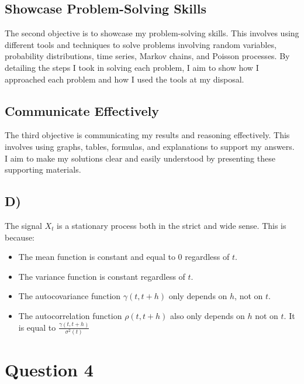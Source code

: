 \documentclass[11pt, letterpaper]{article}
\begin{document}
\subsection{Showcase Problem-Solving Skills}
The second objective is to showcase my problem-solving skills. This involves
using different tools and techniques to solve problems involving random
variables, probability distributions, time series, Markov chains, and Poisson
processes. By detailing the steps I took in solving each problem, I aim to show
how I approached each problem and how I used the tools at my disposal.

\subsection{Communicate Effectively}
The third objective is communicating my results and reasoning effectively. This
involves using graphs, tables, formulas, and explanations to support my
answers. I aim to make my solutions clear and easily understood by presenting
these supporting materials.

\newpage




\newpage
\subsection*{D)}
The signal $X_t$ is a stationary process both in the strict and wide sense.
This is because:

\begin{itemize}
	\item The mean function is constant and equal to $0$ regardless of $t$.

	\item The variance function is constant regardless of $t$.
	\item The autocovariance function $\gamma (t, t+h)$ only depends on
	      $h$, not on
	      $t$.
	\item The autocorrelation function $\rho (t, t+h)$ also only depends on
	      $h$ not on
	      $t$. It is equal to $\frac{\gamma (t, t+h)}{\sigma^2(t)}$
\end{itemize}





\newpage
\section*{Question 4}
\end{document}
